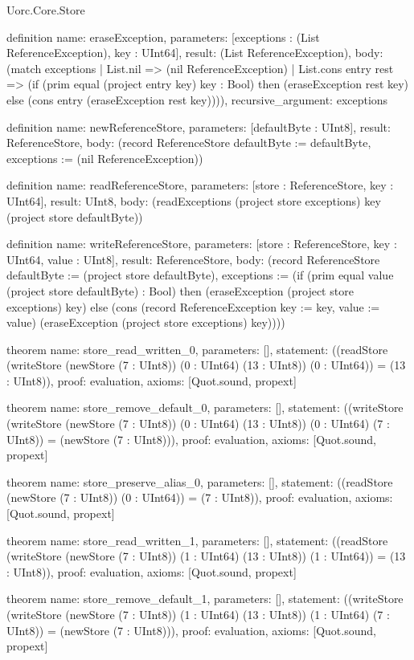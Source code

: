 \begin{lexlean}{Uorc.Core.Store}
\begin{semanticmodule}
definition{
  name: eraseException,
  parameters: [exceptions : (List ReferenceException), key : UInt64],
  result: (List ReferenceException),
  body: (match exceptions
    | List.nil => (nil ReferenceException)
    | List.cons entry rest => (if (prim equal (project entry key) key : Bool) then (eraseException rest key) else (cons entry (eraseException rest key)))),
  recursive_argument: exceptions
}

definition{
  name: newReferenceStore,
  parameters: [defaultByte : UInt8],
  result: ReferenceStore,
  body: (record ReferenceStore {defaultByte := defaultByte, exceptions := (nil ReferenceException)})
}

definition{
  name: readReferenceStore,
  parameters: [store : ReferenceStore, key : UInt64],
  result: UInt8,
  body: (readExceptions (project store exceptions) key (project store defaultByte))
}

definition{
  name: writeReferenceStore,
  parameters: [store : ReferenceStore, key : UInt64, value : UInt8],
  result: ReferenceStore,
  body: (record ReferenceStore {defaultByte := (project store defaultByte), exceptions := (if (prim equal value (project store defaultByte) : Bool) then (eraseException (project store exceptions) key) else (cons (record ReferenceException {key := key, value := value}) (eraseException (project store exceptions) key)))})
}

theorem{
  name: store_read_written_0,
  parameters: [],
  statement: ((readStore (writeStore (newStore (7 : UInt8)) (0 : UInt64) (13 : UInt8)) (0 : UInt64)) = (13 : UInt8)),
  proof: evaluation{},
  axioms: [Quot.sound, propext]
}

theorem{
  name: store_remove_default_0,
  parameters: [],
  statement: ((writeStore (writeStore (newStore (7 : UInt8)) (0 : UInt64) (13 : UInt8)) (0 : UInt64) (7 : UInt8)) = (newStore (7 : UInt8))),
  proof: evaluation{},
  axioms: [Quot.sound, propext]
}

theorem{
  name: store_preserve_alias_0,
  parameters: [],
  statement: ((readStore (newStore (7 : UInt8)) (0 : UInt64)) = (7 : UInt8)),
  proof: evaluation{},
  axioms: [Quot.sound, propext]
}

theorem{
  name: store_read_written_1,
  parameters: [],
  statement: ((readStore (writeStore (newStore (7 : UInt8)) (1 : UInt64) (13 : UInt8)) (1 : UInt64)) = (13 : UInt8)),
  proof: evaluation{},
  axioms: [Quot.sound, propext]
}

theorem{
  name: store_remove_default_1,
  parameters: [],
  statement: ((writeStore (writeStore (newStore (7 : UInt8)) (1 : UInt64) (13 : UInt8)) (1 : UInt64) (7 : UInt8)) = (newStore (7 : UInt8))),
  proof: evaluation{},
  axioms: [Quot.sound, propext]
}


\end{semanticmodule}
\end{lexlean}
